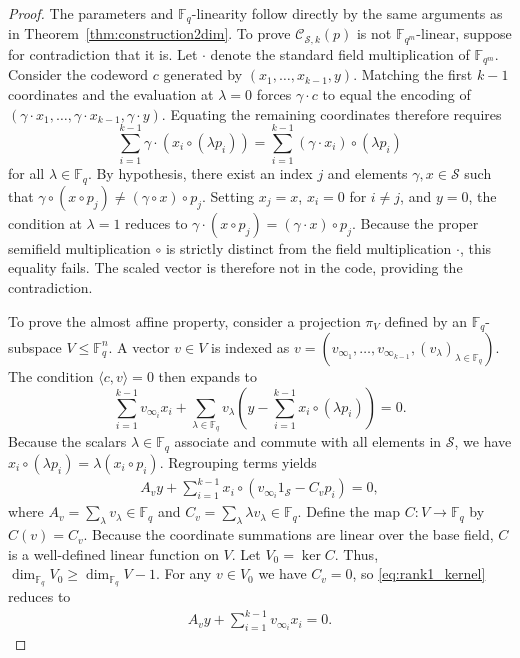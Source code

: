 \documentclass[10pt,a4paper]{amsart}
\newcommand{\F}{\mathbb{F}}
\renewcommand{\S}{\mathcal{S}}
\begin{document}
\begin{proof}
The parameters and $\F_q$-linearity follow directly by the same arguments as in Theorem~\ref{thm:construction2dim}. To prove $\mathcal{C}_{\mathcal{S},k}(p)$ is not $\mathbb{F}_{q^m}$-linear, suppose for contradiction that it is. Let $\cdot$ denote the standard field multiplication of $\F_{q^m}$. Consider the codeword $c$ generated by $(x_1, \dots, x_{k-1}, y)$. Matching the first $k-1$ coordinates and the evaluation at $\lambda = 0$ forces $\gamma \cdot c$ to equal the encoding of $(\gamma \cdot x_1, \dots, \gamma \cdot x_{k-1}, \gamma \cdot y)$. Equating the remaining coordinates therefore requires
    $$\sum_{i=1}^{k-1} \gamma \cdot (x_i \circ (\lambda p_i)) = \sum_{i=1}^{k-1} (\gamma \cdot x_i) \circ (\lambda p_i)$$
for all $\lambda \in \mathbb{F}_q$. By hypothesis, there exist an index $j$ and elements $\gamma, x \in \mathcal{S}$ such that $\gamma \circ (x \circ p_j) \neq (\gamma \circ x) \circ p_j$. Setting $x_j = x$, $x_i = 0$ for $i \neq j$, and $y = 0$, the condition at $\lambda = 1$ reduces to $\gamma \cdot (x \circ p_j) = (\gamma \cdot x) \circ p_j$. Because the proper semifield multiplication $\circ$ is strictly distinct from the field multiplication $\cdot$, this equality fails. The scaled vector is therefore not in the code, providing the contradiction.

To prove the almost affine property, consider a projection $\pi_V$ defined by an $\F_q$-subspace $V\leq \F_{q}^n$. A vector $v\in V$ is indexed as $v= (v_{\infty_1},\ldots,v_{\infty_{k-1}},(v_\lambda)_{\lambda \in \F_q})$. The condition $\langle c,v\rangle =0$ then expands to
\[
    \sum^{k-1}_{i=1} v_{\infty_i} x_i + \sum_{\lambda \in \F_q} v_\lambda \left(y - \sum^{k-1}_{i=1} x_i \circ (\lambda p_i)\right) =0.
\]
Because the scalars $\lambda \in \F_q$ associate and commute with all elements in $\S$, we have $x_i \circ (\lambda p_i) = \lambda (x_i \circ p_i)$. Regrouping terms yields
\begin{align}
    A_v y + \sum^{k-1}_{i=1} x_i \circ (v_{\infty_i} 1_\S - C_v p_i) = 0, \label{eq:rank1_kernel}
\end{align}
where $A_v = \sum_\lambda v_\lambda \in \F_q$ and $C_v = \sum_\lambda \lambda v_\lambda \in \F_q$. Define the map $C\colon V\rightarrow \F_q$ by $C(v) = C_v$. Because the coordinate summations are linear over the base field, $C$ is a well-defined linear function on $V$. Let $V_0 = \ker C$. Thus, $\dim_{\F_q} V_0 \geq \dim_{\F_q} V -1$. For any $v\in V_0$ we have $C_v =0$, so \eqref{eq:rank1_kernel} reduces to
\begin{align} \label{eq:v0_system}
    A_v y + \sum^{k-1}_{i=1} v_{\infty_i} x_i=0.
\end{align}


\end{proof}
\end{document}
